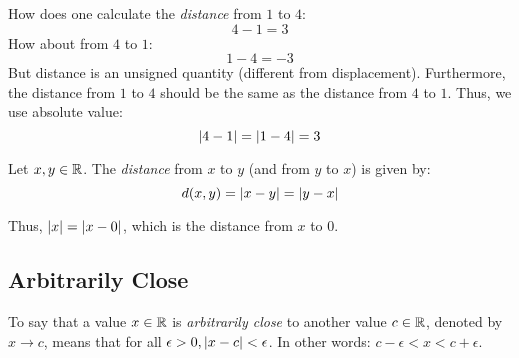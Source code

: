\documentclass[letterpaper,12pt,fleqn]{article}
\newcommand{\e}{\epsilon}
\begin{document}
\bigskip

\begin{center}
\end{center}

How does one calculate the \emph{distance} from \(1\) to \(4\):
\[4-1=3\]
How about from \(4\) to \(1\):
\[1-4=-3\]
But distance is an unsigned quantity (different from displacement).  Furthermore, the distance from \(1\) to \(4\)
should be the same as the distance from \(4\) to \(1\).  Thus, we use absolute value:
\[\lvert4-1\rvert=\lvert1-4\rvert=3\]

\begin{definition}[Distance]
  Let \(x,y\in\mathbb{R}\).  The \emph{distance} from \(x\) to \(y\) (and from \(y\) to \(x\)) is given by:
  \[d(x,y)=\lvert x-y\rvert=\lvert y-x\rvert\]
\end{definition}

Thus, \(\lvert x\rvert=\lvert x-0\rvert\), which is the distance from \(x\) to \(0\).

\subsection*{Arbitrarily Close}

\begin{definition}
  To say that a value \(x\in\mathbb{R}\) is \emph{arbitrarily close} to another value \(c\in\mathbb{R}\), denoted by \(x\to c\),
  means that for all \(\e>0,\abs{x-c}<\e\).  In other words: \(c-\e<x<c+\e\).
\end{definition}

\bigskip

\begin{center}
\end{center}
\end{document}
